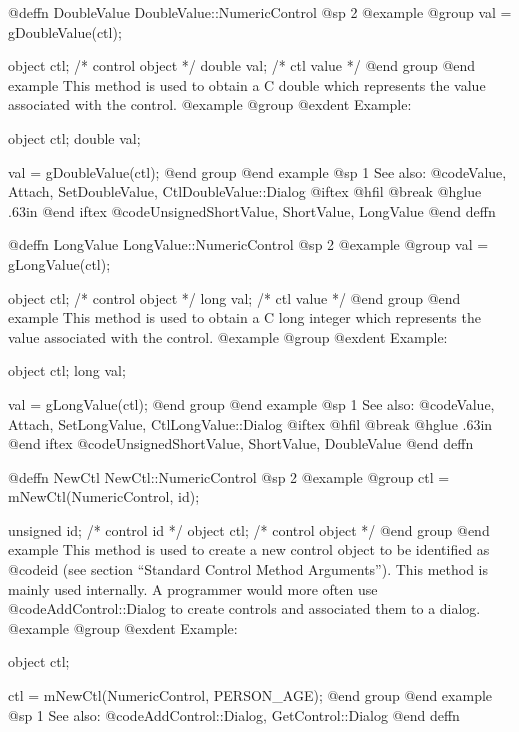 @deffn {DoubleValue} DoubleValue::NumericControl
@sp 2
@example
@group
val = gDoubleValue(ctl);

object  ctl;   /*  control object  */
double  val;   /*  ctl value       */
@end group
@end example
This method is used to obtain a C double which represents the
value associated with the control.  
@example
@group
@exdent Example:

object  ctl;
double  val;

val = gDoubleValue(ctl);
@end group
@end example
@sp 1
See also:  @code{Value, Attach, SetDoubleValue, CtlDoubleValue::Dialog}
@iftex
@hfil @break @hglue .63in 
@end iftex
@code{UnsignedShortValue, ShortValue, LongValue}
@end deffn











@deffn {LongValue} LongValue::NumericControl
@sp 2
@example
@group
val = gLongValue(ctl);

object  ctl;   /*  control object  */
long    val;   /*  ctl value       */
@end group
@end example
This method is used to obtain a C long integer which represents the
value associated with the control.  
@example
@group
@exdent Example:

object  ctl;
long    val;

val = gLongValue(ctl);
@end group
@end example
@sp 1
See also:  @code{Value, Attach, SetLongValue, CtlLongValue::Dialog}
@iftex
@hfil @break @hglue .63in 
@end iftex
@code{UnsignedShortValue, ShortValue, DoubleValue}
@end deffn








@deffn {NewCtl} NewCtl::NumericControl
@sp 2
@example
@group
ctl = mNewCtl(NumericControl, id);

unsigned  id;   /*  control id      */
object   ctl;   /*  control object  */
@end group
@end example
This method is used to create a new control object to be identified as
@code{id} (see section ``Standard Control Method Arguments'').  This
method is mainly used internally.  A programmer would more often
use @code{AddControl::Dialog} to create controls and associated them
to a dialog.
@example
@group
@exdent Example:

object  ctl;

ctl = mNewCtl(NumericControl, PERSON_AGE);
@end group
@end example
@sp 1
See also:  @code{AddControl::Dialog, GetControl::Dialog}
@end deffn









